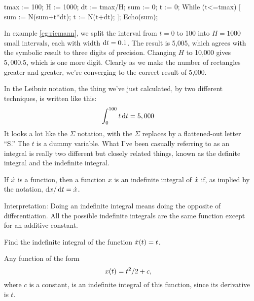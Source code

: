 
\restartLineNumbers
\begin{eg}\label{eg:riemann}
\startcodeeg
\begin{Code}
  \nn tmax := 100;
  \nn H := 1000;
  \nn dt := tmax/H;
  \nn sum := 0;
  \nn t := 0;
  \nn While (t<=tmax) [
  \nn   sum := N(sum+t*dt);
  \nn   t := N(t+dt);
  \nn ];
  \nn Echo(sum);
\end{Code}
\end{eg}

In example \ref{eg:riemann}, we split the interval from $t=0$ to 100 into $H=1000$ small
intervals, each with width $\operatorname{d\!} t=0.1$. The result is 5,005, which agrees with the symbolic
result to three digits of precision. Changing $H$ to 10,000 gives $5,000.5$, which is one
more digit. Clearly as we make the number of rectangles greater and greater, we're converging
to the correct result of 5,000.

In the Leibniz notation,
the thing we've just calculated, by two different techniques, is written like
this:
\begin{equation*}
  \int_{0}^{100} t \operatorname{d\!} t = 5,000
\end{equation*}
It looks a lot like the $\Sigma$ notation, with the $\Sigma$ replaces by a flattened-out letter ``S.''
The $t$ is a dummy variable. What I've been casually referring to as an integral is really two different
but closely related things, known as the definite integral and the indefinite integral.

\begin{important}
If $\dot{x}$ is a function, then a function $x$ is an indefinite integral of $\dot{x}$ if,
as implied by the notation, $\operatorname{d\!} x/\operatorname{d\!} t=\dot{x}$.

Interpretation: Doing an indefinite integral means doing the opposite of differentiation.
All the possible indefinite integrals are the same function except for an additive constant.
\end{important}

\begin{eg}
\egquestion Find the indefinite integral of the function $\dot{x}(t)=t$.

\eganswer Any function of the form
\begin{equation*}
  x(t)=t^2/2+c,
\end{equation*}
where $c$ is a constant, is an
indefinite integral of this function, since its derivative is $t$.
\end{eg}

